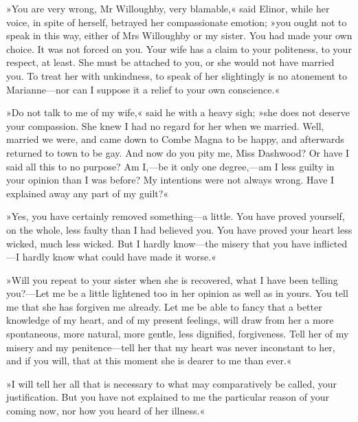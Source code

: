 »You are very wrong, Mr Willoughby, very blamable,« said Elinor, while her voice, in spite of herself, betrayed her compassionate emotion; »you ought not to speak in this way, either of Mrs Willoughby or my sister. You had made your own choice. It was not forced on you. Your wife has a claim to your politeness, to your respect, at least. She must be attached to you, or she would not have married you. To treat her with unkindness, to speak of her slightingly is no atonement to Marianne—nor can I suppose it a relief to your own conscience.«

»Do not talk to me of my wife,« said he with a heavy sigh; »she does not deserve your compassion. She knew I had no regard for her when we married. Well, married we were, and came down to Combe Magna to be happy, and afterwards returned to town to be gay. And now do you pity me, Miss Dashwood? Or have I said all this to no purpose? Am I,—be it only one degree,—am I less guilty in your opinion than I was before? My intentions were not always wrong. Have I explained away any part of my guilt?«

»Yes, you have certainly removed something—a little. You have proved yourself, on the whole, less faulty than I had believed you. You have proved your heart less wicked, much less wicked. But I hardly know—the misery that you have inflicted—I hardly know what could have made it worse.«

»Will you repeat to your sister when she is recovered, what I have been telling you?—Let me be a little lightened too in her opinion as well as in yours. You tell me that she has forgiven me already. Let me be able to fancy that a better knowledge of my heart, and of my present feelings, will draw from her a more spontaneous, more natural, more gentle, less dignified, forgiveness. Tell her of my misery and my penitence—tell her that my heart was never inconstant to her, and if you will, that at this moment she is dearer to me than ever.«

»I will tell her all that is necessary to what may comparatively be called, your justification. But you have not explained to me the particular reason of your coming now, nor how you heard of her illness.«

